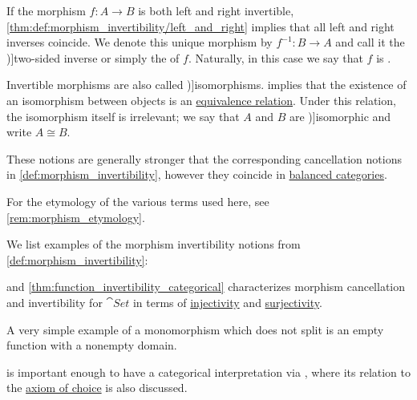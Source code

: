 \begin{definition}
\begin{thmenum}
     If the morphism \( f: A \to B \) is both left and right invertible, \cref{thm:def:morphism_invertibility/left_and_right} implies that all left and right inverses coincide. We denote this unique morphism by \( f^{-1}: B \to A \) and call it the \term[en=two-sided inverse (of functor) (\cite[14]{MacLane1998CategoryTheory})]{two-sided inverse} or simply the  of \( f \). Naturally, in this case we say that \( f \) is .

    Invertible morphisms are also called \term[ru=изоморфизмы (\cite[30]{ЦаленкоШульгейфер1974ОсновыТеорииКатегорий})]{isomorphisms}.  implies that the existence of an isomorphism between objects is an \hyperref[def:equivalence_relation]{equivalence relation}. Under this relation, the isomorphism itself is irrelevant; we say that \( A \) and \( B \) are \term[ru=изоморфные (объекты) (\cite[31]{ЦаленкоШульгейфер1974ОсновыТеорииКатегорий})]{isomorphic} and write \( A \cong B \).
  \end{thmenum}
\end{definition}
\begin{comments}
  \item These notions are generally stronger that the corresponding cancellation notions in \cref{def:morphism_invertibility}, however they coincide in \hyperref[def:balanced_category]{balanced categories}.

  \item For the etymology of the various terms used here, see \cref{rem:morphism_etymology}.
\end{comments}

\begin{example}\label{ex:def:morphism_invertibility}
  We list examples of the morphism invertibility notions from \cref{def:morphism_invertibility}:
  \begin{thmenum}
      and \cref{thm:function_invertibility_categorical} characterizes morphism cancellation and invertibility for \hyperref[def:category_of_small_sets]{\( \cat{Set} \)} in terms of \hyperref[def:function_invertibility/injective]{injectivity} and \hyperref[def:function_invertibility/surjective]{surjectivity}.

     A very simple example of a monomorphism which does not split is an empty function with a nonempty domain.

      is important enough to have a categorical interpretation via , where its relation to the \hyperref[def:zfc/choice]{axiom of choice} is also discussed.
  \end{thmenum}
\end{example}

